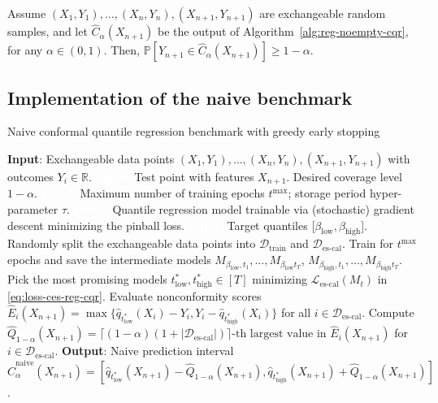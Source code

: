 \begin{corollary}\label{thm:reg-noempty-cqr}
Assume $(X_{1},Y_{1}), \ldots, (X_{n},Y_{n}), (X_{n+1},Y_{n+1})$ are exchangeable random samples, and let $\hat{C}_{\alpha}(X_{n+1})$ be the output of Algorithm~\ref{alg:reg-noempty-cqr}, for any $\alpha \in (0,1)$. 
Then, $\mathbb{P}[Y_{n+1} \in \hat{C}_{\alpha}(X_{n+1})] \geq 1-\alpha$.
\end{corollary}


\subsection{Implementation of the naive benchmark}  \label{app:naive-benchmarks-details-cqr}

\begin{algorithm}[H]
    \caption{Naive conformal quantile regression benchmark with greedy early stopping}
    \label{alg:naive-reg-cqr}
    \begin{algorithmic}[1]
        \STATE \textbf{Input}: Exchangeable data points $(X_{1},Y_{1}), \ldots, (X_{n},Y_{n}), (X_{n+1},Y_{n+1})$ with outcomes $Y_i \in \mathbb{R}$.
        \STATE \textcolor{white}{\textbf{Input}:} Test point with features $X_{n+1}$. Desired coverage level $1-\alpha$.
        \STATE \textcolor{white}{\textbf{Input}:} Maximum number of training epochs $t^{\max}$; storage period hyper-parameter $\tau$.
        \STATE \textcolor{white}{\textbf{Input}:} Quantile regression model trainable via (stochastic) gradient descent minimizing the pinball loss. 
        \STATE \textcolor{white}{\textbf{Input}:} Target quantiles [$\beta_{\text{low}}, \beta_{\text{high}}$]. 
        \STATE Randomly split the exchangeable data points into $\mathcal{D}_{\text{train}}$ and $\mathcal{D}_{\text{es-cal}}$.
        \STATE Train for $t^{\text{max}}$ epochs and save the intermediate models $M_{\beta_{\text{low}},t_1} , \dots, M_{\beta_{\text{low}}t_T}$,  $M_{\beta_{\text{high}},t_1} , \dots, M_{\beta_{\text{high}}t_T}$.
        \STATE Pick the most promising models $t^*_{\text{low}}, t^*_{\text{high}}\in [T]$ minimizing $\mathcal{L}_{\text{es-cal}}(M_t)$ in \eqref{eq:loss-ces-reg-cqr}.
        \STATE Evaluate nonconformity scores $\hat{E}_i(X_{n+1}) = \max\{\hat{q}_{t^*_{\text{low}}}(X_i) - Y_i, Y_i -\hat{q}_{t^*_{\text{high}}}(X_i)\}$ for all $i \in \mathcal{D}_{\text{es-cal}}$.
        \STATE Compute $\hat{Q}_{1-\alpha}(X_{n+1}) = \lceil (1-\alpha)(1+|\mathcal{D}_{\text{es-cal}}|) \rceil\text{-th largest value in }
        \hat{E}_i(X_{n+1})$ for $i \in \mathcal{D}_{\text{es-cal}}$.
        \STATE \textbf{Output}: Naive prediction interval $\hat{C}^{\text{naive}}_{\alpha}(X_{n+1}) = [\hat{q}_{t^*_{\text{low}}}(X_{n+1}) - \hat{Q}_{1-\alpha}(X_{n+1}), \hat{q}_{t^*_{\text{high}}}(X_{n+1}) + \hat{Q}_{1-\alpha}(X_{n+1})]$.
    \end{algorithmic}
\end{algorithm}

